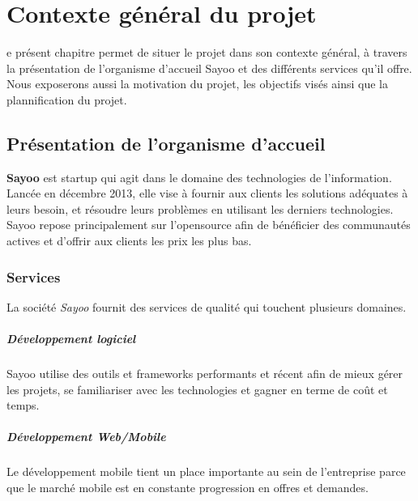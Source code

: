\chapter{Contexte général du projet}
\begin{onehalfspace}

e présent chapitre permet de situer le projet dans son contexte général, à travers la présentation de l'organisme d'accueil Sayoo et des différents services qu'il offre. Nous exposerons aussi la motivation du projet, les objectifs visés ainsi que la plannification du projet.

\newpage


\section{Présentation de l'organisme d'accueil}

\textbf{Sayoo} est startup qui agit dans le domaine des technologies de l'information. Lancée en décembre 2013, elle vise à fournir aux clients les solutions adéquates à leurs besoin, et résoudre leurs problèmes en utilisant les derniers technologies. Sayoo repose principalement sur l'opensource afin de bénéficier des communautés actives et d'offrir aux clients les prix les plus bas.



\subsection{Services}
La société \emph{Sayoo} fournit des services de qualité qui touchent plusieurs domaines.
\paragraph*{Développement logiciel}
Sayoo utilise des outils et frameworks performants et récent afin de mieux gérer les projets, se familiariser avec les technologies et gagner en terme de coût et temps.

\paragraph*{Développement Web/Mobile}
Le développement mobile tient un place importante au sein de l'entreprise parce que le marché mobile est en constante progression en offres et demandes. 


\end{onehalfspace}
